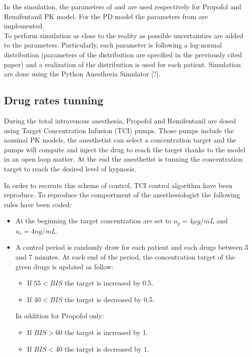 In the simulation, the parameters of \cite{eleveldPharmacokineticPharmacodynamicModel2018} and \cite{eleveldAllometricModelRemifentanil2017} are used respectively for Propofol and Remifentanil PK model. For the PD model the parameters from \cite{bouillonPharmacodynamicInteractionPropofol2004} are implemented. \\
To perform simulation as close to the reality as possible uncertainties are added to the parameters. Particularly, each parameter is following a log-normal distribution (parameters of the distribution are specified in the previously cited paper) and a realization of the distribution is used for each patient. Simulation are done using the Python Anesthesia Simulator [?].

\subsection{Drug rates tunning}

During the total intravenous anesthesia, Propofol and Remifentanil are dosed using Target Concentration Infusion (TCI) pumps. Those pumps include the nominal PK models, the anesthetist can select a concentration target and the pumps will compute and inject the drug to reach the target thanks to the model in an open loop matter. At the end the anesthetist is tunning the concentration target to reach the desired level of hypnosis.
\medskip


In order to recreate this scheme of control, TCI control algorithm \cite{shaferAlgorithmsRapidlyAchieve1992} have been reproduce. To reproduce the comportment of the anesthesiologist the following rules have been coded:
\begin{itemize}
\item At the beginning the target concentration are set to $u_p = 4 \mu g/mL$ and $u_r = 4 ng/mL$.
\item A control period is randomly draw for each patient and each drugs between 3 and 7 minutes. At each end of the period, the concentration target of the given drugs is updated as follow:
\begin{itemize}
	\item If $55<BIS$ the target is increased by 0.5.
	\item If $40<BIS$ the target is decreased by 0.5.
\end{itemize}
In addition for Propofol only:
\begin{itemize}
	\item If $BIS>60$ the target is increased by 1.
	\item If $BIS<40$ the target is decreased by 1.
\end{itemize}
\end{itemize}

